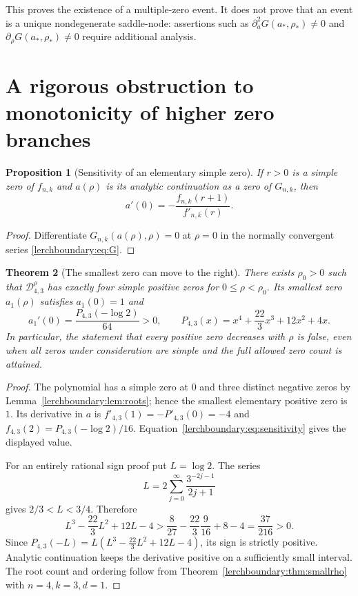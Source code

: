 \documentclass[11pt,a4paper]{article}
\newtheorem{theorem}{Theorem}[section]
\newtheorem{proposition}[theorem]{Proposition}
\theoremstyle{definition}
\theoremstyle{remark}
\numberwithin{equation}{section}
\begin{document}
This proves the existence of a multiple-zero event.  It does not prove
that an event is a unique nondegenerate saddle-node: assertions such as
$\partial_a^2G(a_*,\rho_*)\neq0$ and
$\partial_\rho G(a_*,\rho_*)\neq0$ require additional analysis.

\section{A rigorous obstruction to monotonicity of higher zero branches}
\label{lerchboundary:sec:monotonicity}

\begin{proposition}[Sensitivity of an elementary simple zero]
\label{lerchboundary:prop:sensitivity}
If $r>0$ is a simple zero of $f_{n,k}$ and $a(\rho)$ is its analytic
continuation as a zero of $G_{n,k}$, then
\begin{equation}\label{lerchboundary:eq:sensitivity}
 a'(0)=-\frac{f_{n,k}(r+1)}{f'_{n,k}(r)}.
\end{equation}
\end{proposition}

\begin{proof}
Differentiate $G_{n,k}(a(\rho),\rho)=0$ at $\rho=0$ in the normally
convergent series \eqref{lerchboundary:eq:G}.
\end{proof}

\begin{theorem}[The smallest zero can move to the right]
\label{lerchboundary:thm:counterexample}
There exists $\rho_0>0$ such that $\mathcal D_{4,3}^{\rho}$ has exactly
four simple positive zeros for $0\leq\rho<\rho_0$. Its smallest zero
$a_1(\rho)$ satisfies $a_1(0)=1$ and
\begin{equation}\label{lerchboundary:eq:counterexample}
 a_1'(0)=\frac{P_{4,3}(-\log2)}{64}>0,
 \qquad P_{4,3}(x)=x^4+\frac{22}{3}x^3+12x^2+4x.
\end{equation}
In particular, the statement that every positive zero decreases with
$\rho$ is false, even when all zeros under consideration are simple
and the full allowed zero count is attained.
\end{theorem}

\begin{proof}
The polynomial has a simple zero at $0$ and three distinct negative
zeros by Lemma~\ref{lerchboundary:lem:roots}; hence the smallest
elementary positive zero is $1$. Its derivative in $a$ is
$f'_{4,3}(1)=-P'_{4,3}(0)=-4$ and
$f_{4,3}(2)=P_{4,3}(-\log2)/16$.
Equation~\eqref{lerchboundary:eq:sensitivity} gives the displayed value.

For an entirely rational sign proof put $L=\log2$.  The series
\[
 L=2\sum_{j=0}^{\infty}\frac{3^{-2j-1}}{2j+1}
\]
gives $2/3<L<3/4$. Therefore
\[
 L^3-\frac{22}{3}L^2+12L-4
 >\frac8{27}-\frac{22}{3}\frac9{16}+8-4
 =\frac{37}{216}>0.
\]
Since $P_{4,3}(-L)=L(L^3-\tfrac{22}{3}L^2+12L-4)$, its sign is
strictly positive.  Analytic continuation keeps the derivative
positive on a sufficiently small interval.  The root count and
ordering follow from Theorem~\ref{lerchboundary:thm:smallrho} with
$n=4,k=3,d=1$.
\end{proof}
\end{document}

